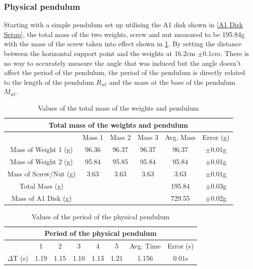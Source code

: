 \documentclass[12pt]{article}
\begin{document}
\subsubsection{Physical pendulum}
\label{Physcial Pendulum Findings}

Starting with a simple pendulum set up utilising the A1 disk shown in \cref{A1 Disk Setup}, the total mass of the two weights, screw and nut measured to be 195.84g with the mass of the screw taken into effect shown in \cref{Values of the total mass of the weights and pendulum table}. By setting the distance between the horizontal support point and the weights at 16.2cm $\pm0.1cm$. There is no way to accurately measure the angle that was induced but the angle doesn't affect the period of the pendulum, the period of the pendulum is directly related to the length of the pendulum $R_{wt}$ and the mass at the base of the pendulum $M_{wt}$. \\

\begin{table}[H]
\begin{center}
 \footnotesize
 \begin{tabular}{|c||c|c|c|c|c|}
 \hline
 \multicolumn{6}{|c|}{Total mass of the weights and pendulum} \\
 \hline \hline
  & Mass 1 & Mass 2 & Mass 3 & Avg. Mass & Error (g) \\
 \hline
 Mass of Weight 1 (g) & 96.36 & 96.37 & 96.37 & 96.37 & $\pm$0.01g \\
 \hline
 Mass of Weight 2 (g) & 95.84 & 95.85 & 95.84 & 95.84 & $\pm$0.01g \\
 \hline
 Mass of Screw/Nut (g) & 3.63 & 3.63 & 3.63 & 3.63 & $\pm$0.01g \\
 \hline \hline
 Total Mass (g) &&&& 195.84 & $\pm$0.03g \\
 \hline \hline
 Mass of A1 Disk (g) &&&& 729.55 & $\pm$0.02g \\
 \hline
 \end{tabular}
 \caption{Values of the total mass of the weights and pendulum}
 \label{Values of the total mass of the weights and pendulum table}
\end{center}
\end{table}

\begin{table}[H]
\begin{center}
 \footnotesize
 \begin{tabular}{|c||c|c|c|c|c|c|c|}
 \hline
 \multicolumn{8}{|c|}{Period of the physical pendulum} \\
 \hline \hline
  & 1 & 2 & 3 & 4 & 5 & Avg. Time & Error (s) \\
 \hline
 $\Delta$T (s) & 1.19 & 1.15 & 1.10 & 1.13 & 1.21 & 1.156 & $0.01$s \\
 \hline
 \end{tabular}
 \caption{Values of the period of the physical pendulum}
 \label{Values of the period of the physical pendulum table}
\end{center}
\end{table}
\end{document}
